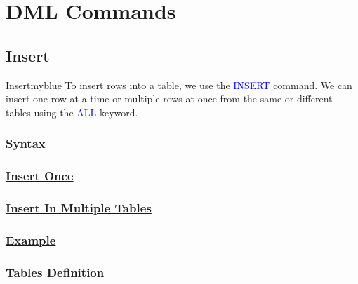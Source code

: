 \vspace{0.5cm}
\section{DML Commands}

\subsection{Insert}

\begin{prettyBox}{Insert}{myblue}
To insert rows into a table, we use the \textcolor{blue}{INSERT} command. We can insert one row at a time or multiple rows at once from the same or different tables using the \textcolor{blue}{ALL} keyword.
\end{prettyBox}

\subsubsection*{\underline{\textbf{Syntax}}}

\subsubsection*{\textbf{\underline{Insert Once}}}



\subsubsection*{\textbf{\underline{Insert In Multiple Tables}}}




\subsubsection*{\underline{\textbf{Example}}}

\subsubsection*{\underline{\textbf{Tables Definition}}}

